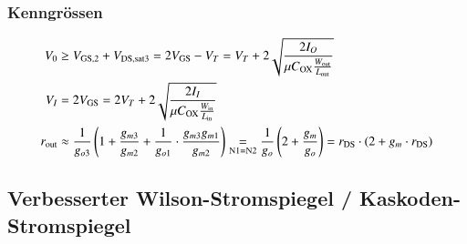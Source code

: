 \subsubsection{Kenngrössen}
\label{Kenngrössen Wilson}

\vspace{-0.4cm}

\begin{align*}
    V_0         &\geq V_{\rm GS,2} + V_{\rm DS,sat3} = 2 V_{\rm GS} - V_T = V_T + 2 \sqrt{ \frac{2 I_O}{\mu C_{\rm OX} \frac{W_{\rm out}}{L_{\rm out}}} }                                                                                           \\
    V_I         &= 2 V_{\rm GS} = 2 V_T + 2 \sqrt{ \frac{2 I_I}{\mu C_{\rm OX} \frac{W_{\rm in}}{L_{\rm in}}} }                                                                                                                                     \\
    r_{\rm out} &\approx \frac{1}{g_{o3}} \left( 1 + \frac{g_{m3}}{g_{m2}} + \frac{1}{g_{o1}} \cdot \frac{g_{m3} g_{m1}}{g_{m2}} \right) \underset{\rm N1 = N2}{=} \frac{1}{g_o} \left( 2 + \frac{g_m}{g_o} \right) = r_{\rm DS} \cdot (2 + g_m \cdot r_{\rm DS})
\end{align*}



\subsection{Verbesserter Wilson-Stromspiegel / Kaskoden-Stromspiegel}

